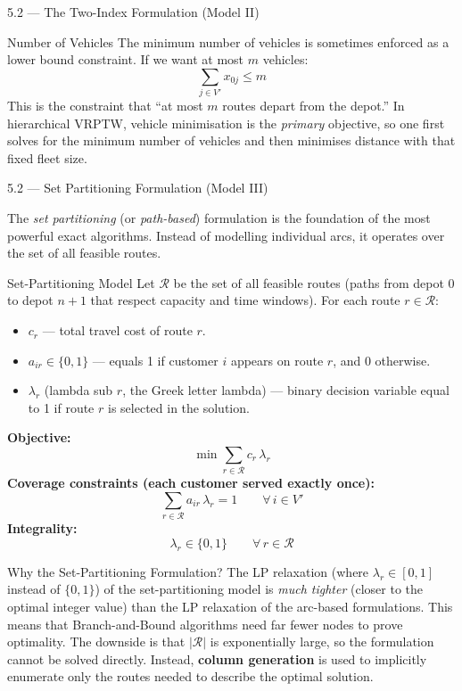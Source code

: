 \documentclass[aspectratio=169,10pt]{beamer}
\begin{document}
\begin{frame}[allowframebreaks]{5.2 --- The Two-Index Formulation (Model II)}
\begin{block}{Number of Vehicles}
The minimum number of vehicles is sometimes enforced as a lower bound constraint.
If we want at most $m$ vehicles:
\[
  \sum_{j \in V'} x_{0j} \leq m
\]
This is the constraint that ``at most $m$ routes depart from the depot.''  In
hierarchical VRPTW, vehicle minimisation is the \emph{primary} objective, so one
first solves for the minimum number of vehicles and then minimises distance with
that fixed fleet size.
\end{block}

\end{frame}

\begin{frame}[allowframebreaks]{5.2 --- Set Partitioning Formulation (Model III)}

The \emph{set partitioning} (or \emph{path-based}) formulation is the foundation of
the most powerful exact algorithms.  Instead of modelling individual arcs, it
operates over the set of all feasible routes.

\begin{block}{Set-Partitioning Model}
Let $\mathcal{R}$ be the set of all feasible routes (paths from depot $0$ to depot
$n+1$ that respect capacity and time windows).  For each route $r \in \mathcal{R}$:
\begin{itemize}
  \item $c_r$ \; --- total travel cost of route $r$.
  \item $a_{ir} \in \{0,1\}$ \; --- equals 1 if customer $i$ appears on route $r$,
    and 0 otherwise.
  \item $\lambda_r$ (lambda sub $r$, the Greek letter lambda) \; --- binary
    decision variable equal to 1 if route $r$ is selected in the solution.
\end{itemize}

\textbf{Objective:}
\[
  \min \sum_{r \in \mathcal{R}} c_r \, \lambda_r
\]
\textbf{Coverage constraints (each customer served exactly once):}
\[
  \sum_{r \in \mathcal{R}} a_{ir} \, \lambda_r = 1 \qquad \forall\, i \in V'
\]
\textbf{Integrality:}
\[
  \lambda_r \in \{0, 1\} \qquad \forall\, r \in \mathcal{R}
\]
\end{block}

\framebreak

\begin{alertblock}{Why the Set-Partitioning Formulation?}
The LP relaxation (where $\lambda_r \in [0,1]$ instead of $\{0,1\}$) of the
set-partitioning model is \emph{much tighter} (closer to the optimal integer
value) than the LP relaxation of the arc-based formulations.  This means that
Branch-and-Bound algorithms need far fewer nodes to prove optimality.  The downside
is that $|\mathcal{R}|$ is exponentially large, so the formulation cannot be solved
directly.  Instead, \textbf{column generation} is used to implicitly enumerate only
the routes needed to describe the optimal solution.
\end{alertblock}


\end{frame}
\end{document}
